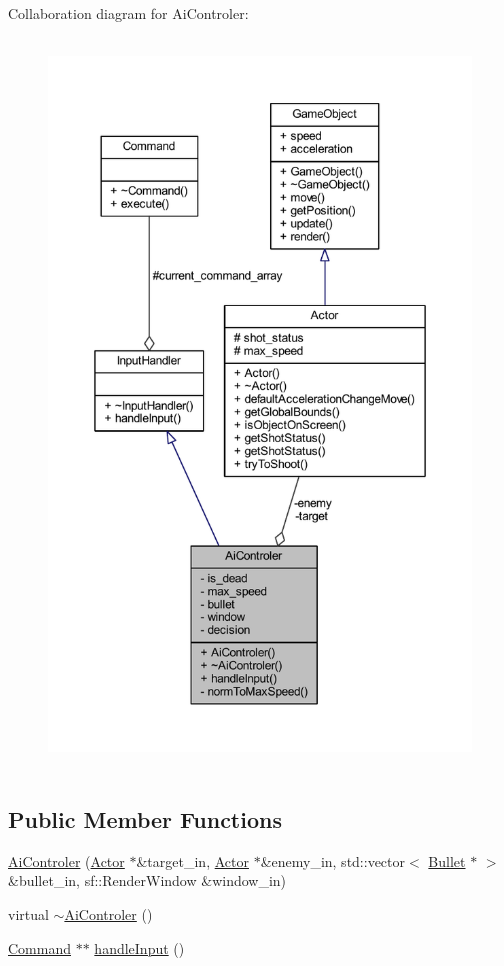 Collaboration diagram for Ai\+Controler\+:\nopagebreak
\begin{figure}[H]
\begin{center}
\leavevmode
\includegraphics[height=550pt]{class_ai_controler__coll__graph}
\end{center}
\end{figure}
\subsection*{Public Member Functions}
\begin{DoxyCompactItemize}
\item 
\hyperlink{class_ai_controler_a33bdaad21e07f2d93ae0ea277035193b}{Ai\+Controler} (\hyperlink{class_actor}{Actor} $\ast$\&target\+\_\+in, \hyperlink{class_actor}{Actor} $\ast$\&enemy\+\_\+in, std\+::vector$<$ \hyperlink{class_bullet}{Bullet} $\ast$ $>$ \&bullet\+\_\+in, sf\+::\+Render\+Window \&window\+\_\+in)
\item 
virtual \hyperlink{class_ai_controler_aa58de5f8ccbff5d293c57cdf2a80e8c5}{$\sim$\+Ai\+Controler} ()
\item 
\hyperlink{class_command}{Command} $\ast$$\ast$ \hyperlink{class_ai_controler_a72891536d5ff122ae1e3a25fd62fd1b5}{handle\+Input} ()
\end{DoxyCompactItemize}
